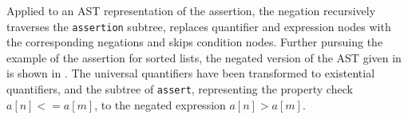 Applied to an AST representation of the assertion, the negation recursively traverses the \texttt{assertion} subtree, replaces quantifier and expression nodes with the corresponding negations and skips condition nodes. Further pursuing the example of the assertion for sorted lists, the negated version of the AST given in  is shown in . The universal quantifiers have been transformed to existential quantifiers, and the subtree of \texttt{assert}, representing the property check $a[n] <= a[m]$, to the negated expression $a[n] > a[m]$.

\begin{figure}[t]
\hfill
{}
\end{figure}
